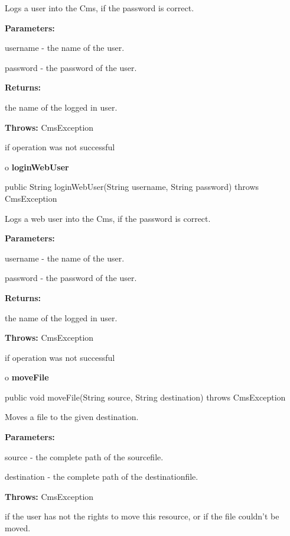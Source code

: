 \begin{description}
\htmlDD Logs a user into the Cms, if the password is correct. 

\begin{description}
\item {\bf Parameters:}  

username - the name of the user.  

password - the password of the user.  
\item {\bf Returns:}  

the name of the logged in user.  
\item {\bf Throws:} CmsException  

if operation was not successful  
\end{description}

\end{description}

o {\bf loginWebUser} 

\begin{PRE}
 public String loginWebUser(String username,
                            String password) throws CmsException
\end{PRE}

\begin{description}
\htmlDD Logs a web user into the Cms, if the password is correct. 

\begin{description}
\item {\bf Parameters:}  

username - the name of the user.  

password - the password of the user.  
\item {\bf Returns:}  

the name of the logged in user.  
\item {\bf Throws:} CmsException  

if operation was not successful  
\end{description}

\end{description}

o {\bf moveFile} 

\begin{PRE}
 public void moveFile(String source,
                      String destination) throws CmsException
\end{PRE}

\begin{description}
\htmlDD Moves a file to the given destination. 

\begin{description}
\item {\bf Parameters:}  

source - the complete path of the sourcefile.  

destination - the complete path of the destinationfile.  
\item {\bf Throws:} CmsException  

if the user has not the rights to move this resource, or if the file couldn't
be moved.  
\end{description}

\end{description}

